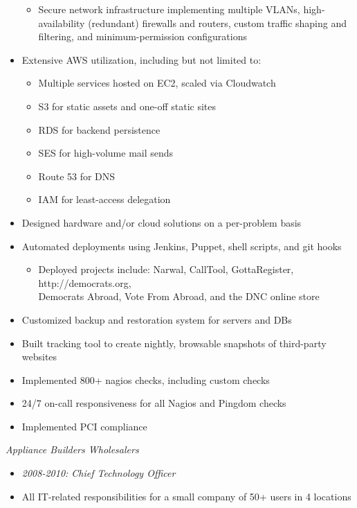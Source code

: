 \documentclass[11pt]{res} %
\begin{document}
\begin{resume}
\begin{itemize}
\begin{itemize}
                    \item Secure network infrastructure implementing multiple VLANs, high-availability (redundant) firewalls and routers, custom traffic shaping and filtering, and minimum-permission configurations
                \end{itemize}
            \item Extensive AWS utilization, including but not limited to:
                \begin{itemize}
                    \item Multiple services hosted on EC2, scaled via Cloudwatch
                    \item S3 for static assets and one-off static sites
                    \item RDS for backend persistence
                    \item SES for high-volume mail sends
                    \item Route 53 for DNS
                    \item IAM for least-access delegation
                \end{itemize}
            \item Designed hardware and/or cloud solutions on a per-problem basis
            \item Automated deployments using Jenkins, Puppet, shell scripts, and git hooks
                \begin{itemize}
                    \item Deployed projects include: Narwal, CallTool, GottaRegister, http://democrats.org, \\Democrats Abroad, Vote From Abroad, and the DNC online store
                \end{itemize}
            \item Customized backup and restoration system for servers and DBs
            \item Built tracking tool to create nightly, browsable snapshots of third-party websites
            \item Implemented 800+ nagios checks, including custom checks
            \item 24/7 on-call responsiveness for all Nagios and Pingdom checks
            \item Implemented PCI compliance
        \end{itemize}


\newpage
{\sl Appliance Builders Wholesalers} 
    \begin{itemize} 
        \item {\sl 2008-2010: Chief Technology Officer}
        \item All IT-related responsibilities for a small company of 50+ users in 4 locations
    \end{itemize}


\end{resume}
\end{document}
